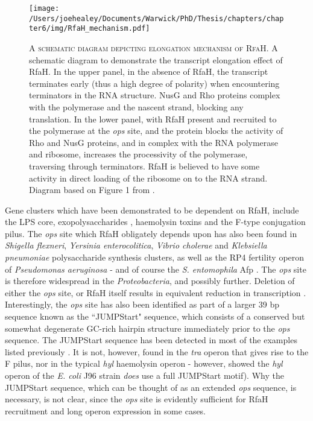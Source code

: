 \begin{figure}[h]
    \texttt{[image: /Users/joehealey/Documents/Warwick/PhD/Thesis/chapters/chapter6/img/RfaH\_mechanism.pdf]}
    \captionsetup{singlelinecheck=off, justification=justified, font=footnotesize, aboveskip=0pt}
    \caption[Schematic diagram of the mechanism of RfaH-mediated transcript elongation]{\textsc{\normalsize A schematic diagram depicting elongation mechanism of RfaH.} \vspace{0.1cm} \newline A schematic diagram to demonstrate the transcript elongation effect of RfaH. In the upper panel, in the absence of RfaH, the transcript terminates early (thus a high degree of polarity) when encountering terminators in the RNA structure. NusG and Rho proteins complex with the polymerase and the nascent strand, blocking any translation. In the lower panel, with RfaH present and recruited to the polymerase at the \emph{ops} site, and the protein blocks the activity of Rho and NusG proteins, and in complex with the RNA polymerase and ribosome, increases the processivity of the polymerase, traversing through terminators. RfaH is believed to have some activity in direct loading of the ribosome on to the RNA strand. Diagram based on Figure 1 from \cite{Hu2017}. }
\label{rfahmechanism}
\end{figure}


Gene clusters which have been demonstrated to be dependent on RfaH, include the LPS core, exopolysaccharides \citep{Wilkinson1972}, haemolysin toxins \citep{Landraud2003, Leeds1996, Leeds1997} and the F-type conjugation pilus. The \emph{ops} site which RfaH obligately depends upon has also been found in \emph{Shigella flexneri}, \emph{Yersinia enterocolitica}, \emph{Vibrio cholerae} and \emph{Klebsiella pneumoniae} polysaccharide synthesis clusters, as well as the RP4 fertility operon of \emph{Pseudomonas aeruginosa} \citep{Bailey1997} - and of course the \emph{S. entomophila} Afp \citep{Hurst2007a}. The \emph{ops} site is therefore widespread in the \emph{Proteobacteria}, and possibly further. Deletion of either the \emph{ops} site, or RfaH itself results in equivalent reduction in transcription \citep{Bailey1997}. Interestingly, the \emph{ops} site has also been identified as part of a larger 39 bp sequence known as the ``JUMPStart" sequence, which consists of a conserved but somewhat degenerate GC-rich hairpin structure immediately prior to the \emph{ops} sequence. The JUMPStart sequence has been detected in most of the examples listed previously \citep{Wang1998}. It is not, however, found in the \emph{tra} operon that gives rise to the F pilus, nor in the typical \emph{hyl} haemolysin operon \citep{Nieto1996} - however, \cite{Leeds1997} showed the \emph{hyl} operon of the \emph{E. coli} J96 strain \emph{does} use a full JUMPStart motif). Why the JUMPStart sequence, which can be thought of as an extended \emph{ops} sequence, is necessary, is not clear, since the \emph{ops} site is evidently sufficient for RfaH recruitment and long operon expression in some cases.

